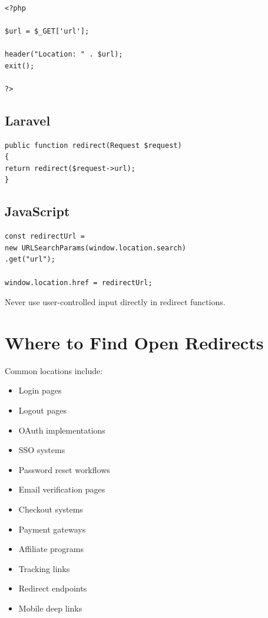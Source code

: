 \documentclass{article}
\begin{document}
\begin{lstlisting}

<?php

$url = $_GET['url'];

header("Location: " . $url);
exit();

?>

\end{lstlisting}

\subsection{Laravel}

\begin{lstlisting}
public function redirect(Request $request)
{
return redirect($request->url);
}
\end{lstlisting}

\subsection{JavaScript}

\begin{lstlisting}
const redirectUrl =
new URLSearchParams(window.location.search)
.get("url");

window.location.href = redirectUrl;
\end{lstlisting}

\begin{warningbox}
Never use user-controlled input directly in redirect functions.
\end{warningbox}


\section{Where to Find Open Redirects}

Common locations include:

\begin{itemize}
\item Login pages
\item Logout pages
\item OAuth implementations
\item SSO systems
\item Password reset workflows
\item Email verification pages
\item Checkout systems
\item Payment gateways
\item Affiliate programs
\item Tracking links
\item Redirect endpoints
\item Mobile deep links
\end{itemize}
\end{document}
